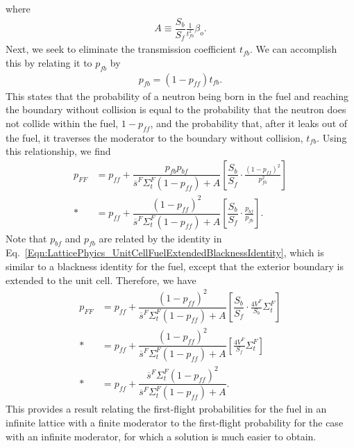 where
\begin{align}
  A \equiv \dfrac{S_b}{S_f} \frac{1}{t_{fb}^2} \beta_o .
\end{align}
Next, we seek to eliminate the transmission coefficient $t_{fb}$. We can accomplish this by relating it to $p_{fb}$ by
\begin{align}
  p_{fb} =  ( 1 - p_{ff} ) t_{fb} .
\end{align}
This states that the probability of a neutron being born in the fuel and reaching the boundary without collision is equal to the probability that the neutron does not collide within the fuel, $1 - p_{ff}$, and the probability that, after it leaks out of the fuel, it traverses the moderator to the boundary without collision, $t_{fb}$. Using this relationship, we find
\begin{align}
  p_{FF} 
  &= p_{ff} + \dfrac{ p_{fb} p_{bf} }{  \overline{s}^F \Sigma_t^F ( 1 - p_{ff} ) + A } \left[ \dfrac{S_b}{S_f} \cdot \frac{( 1 - p_{ff})^2}{p_{fb}^2} \right] \nonumber \\*
  &= p_{ff} + \dfrac{ ( 1 - p_{ff})^2  }{  \overline{s}^F \Sigma_t^F ( 1 - p_{ff} ) + A } \left[ \dfrac{S_b}{S_f} \cdot \frac{p_{bf}}{p_{fb}} \right] .
\end{align}
Note that $p_{bf}$ and $p_{fb}$ are related by the identity in Eq.~\eqref{Eqn:LatticePhyics_UnitCellFuelExtendedBlacknessIdentity}, which is similar to a blackness identity for the fuel, except that the exterior boundary is extended to the unit cell. Therefore, we have
\begin{align}
  p_{FF} 
  &= p_{ff} + \dfrac{ ( 1 - p_{ff})^2  }{  \overline{s}^F \Sigma_t^F ( 1 - p_{ff} ) + A } \left[ \dfrac{S_b}{S_f} \cdot \frac{4V^F}{S_b} \Sigma_t^F \right] \nonumber \\*
  &= p_{ff} + \dfrac{ ( 1 - p_{ff})^2  }{  \overline{s}^F \Sigma_t^F ( 1 - p_{ff} ) + A } \left[ \frac{4V^F}{S_f} \Sigma_t^F \right] \nonumber \\*
  &= p_{ff} + \dfrac{ \overline{s}^F \Sigma_t^F ( 1 - p_{ff})^2  }{  \overline{s}^F \Sigma_t^F ( 1 - p_{ff} ) + A } . \label{Eqn:LatticePhysics_RelationshipFirstFlightProbabilityLattice}
\end{align}
This provides a result relating the first-flight probabilities for the fuel in an infinite lattice with a finite moderator to the first-flight probability for the case with an infinite moderator, for which a solution is much easier to obtain.

